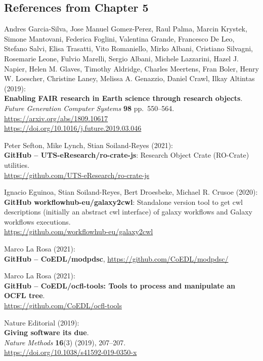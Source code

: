 \begin{thebibliography}{9}
\section{References from Chapter 5}


Andres Garcia-Silva, Jose Manuel Gomez-Perez, Raul Palma,
Marcin Krystek, Simone Mantovani, Federica Foglini, Valentina Grande,
Francesco De Leo, Stefano Salvi, Elisa Trasatti, Vito Romaniello, Mirko
Albani, Cristiano Silvagni, Rosemarie Leone, Fulvio Marelli, Sergio
Albani, Michele Lazzarini, Hazel J. Napier, Helen M. Glaves, Timothy
Aldridge, Charles Meertens, Fran Boler, Henry W. Loescher, Christine
Laney, Melissa A. Genazzio, Daniel Crawl, Ilkay Altintas (2019):\\
\textbf{Enabling FAIR research in Earth science through research
objects}.\\
\emph{Future Generation Computer Systems} \textbf{98} pp.~550--564.\\
\url{https://arxiv.org/abs/1809.10617}\\
\url{https://doi.org/10.1016/j.future.2019.03.046}

Peter Sefton, Mike Lynch, Stian Soiland-Reyes (2021):\\
\textbf{GitHub -- UTS-eResearch/ro-crate-js}: Research Object Crate
(RO-Crate) utilities.\\
\url{https://github.com/UTS-eResearch/ro-crate-js}

Ignacio Eguinoa, Stian Soiland-Reyes, Bert Droesbeke, Michael
R. Crusoe (2020):\\
\textbf{GitHub workflowhub-eu/galaxy2cwl}: Standalone version tool to
get cwl descriptions (initially an abstract cwl interface) of galaxy
workflows and Galaxy workflows executions.\\
\url{https://github.com/workflowhub-eu/galaxy2cwl}

Marco La Rosa (2021):\\
\textbf{GitHub -- CoEDL/modpdsc},
\url{https://github.com/CoEDL/modpdsc/}

Marco La Rosa (2021):\\
\textbf{GitHub -- CoEDL/ocfl-tools: Tools to process and manipulate an OCFL tree}.\\
\url{https://github.com/CoEDL/ocfl-tools}

Nature Editorial (2019):\\
\textbf{Giving software its due}.\\
\emph{Nature Methods} \textbf{16}(3) (2019), 207--207.\\
\url{https://doi.org/10.1038/s41592-019-0350-x}


\end{thebibliography}
